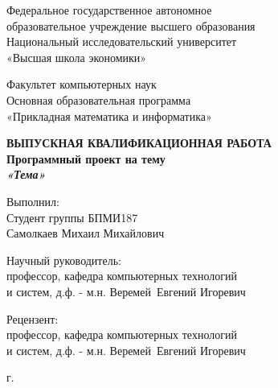 \begin{titlepage}
\begin{center}

Федеральное государственное автономное\\
образовательное учреждение высшего образования\\
Национальный исследовательский университет\\
«Высшая школа экономики»

\vspace{10mm}
Факультет компьютерных наук\\
Основная образовательная программа\\
«Прикладная математика и информатика»

\vspace{20mm}

\textbf{\large ВЫПУСКНАЯ КВАЛИФИКАЦИОННАЯ РАБОТА}\\[3mm]

\textbf{\large Программный проект на тему}\\
\textbf{\textit{\large «Тема»}}

\vspace{20mm}

\begin{flushleft}
\begin{minipage}[t]{0.65\textwidth}
{Выполнил:} \\
Студент группы БПМИ187 \\
Самолкаев Михаил Михайлович

\vspace{10mm}

{Научный руководитель:} \\
профессор, кафедра компьютерных технологий \\ и систем, д.ф. - м.н. Веремей~Евгений Игоревич

\vspace{10mm}

{Рецензент:} \\
профессор, кафедра компьютерных технологий \\и систем, д.ф. - м.н. Веремей~Евгений Игоревич
\end{minipage}
\end{flushleft}

\vfill 

\par{\the\year{} г.}
\end{center}
\end{titlepage}
\restoregeometry
\addtocounter{page}{1}

